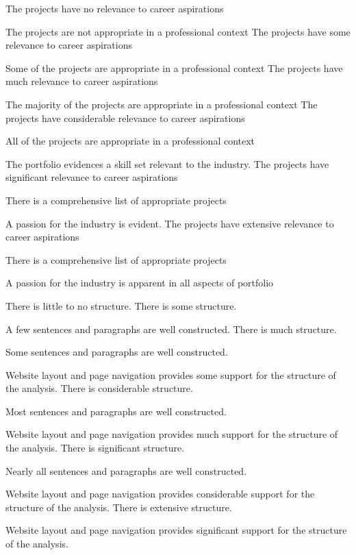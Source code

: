\documentclass{../../fal_assignment}
\begin{document}
\begin{markingrubric}
        \grade \fail  	The projects have no relevance to career aspirations
        		\par 			The projects are not appropriate in a professional context			
        \grade 		The projects have some relevance to career aspirations
        		\par 			Some of the projects are appropriate in a professional context
	\grade 		The projects have much relevance to career aspirations
		\par			The majority of the projects are appropriate in a professional context
        \grade 		The projects have considerable relevance to career aspirations
        		\par 			All of the projects are appropriate in a professional context
		\par			The portfolio evidences a skill set relevant to the industry.
        \grade 		The projects have significant relevance to career aspirations
        		\par			There is a comprehensive list of appropriate projects
		\par			A passion for the industry is evident.
        \grade 		The projects have extensive relevance to career aspirations	
      		\par 			There is a comprehensive list of appropriate projects
		\par 			A passion for the industry is apparent in all aspects of portfolio
        
        \grade\fail 	There is little to no structure.
        \grade 		There is some structure.
        \par 		A few sentences and paragraphs are well constructed.
        \grade 		There is much structure.
        \par 		Some sentences and paragraphs are well constructed.
        \par 		Website layout and page navigation provides some support for the structure of the analysis.
        \grade 		There is considerable structure.
        \par 		Most sentences and paragraphs are well constructed.
        \par 		Website layout and page navigation provides much support for the structure of the analysis.
        \grade 		There is significant structure.
        \par 		Nearly all sentences and paragraphs are well constructed.
        \par 		Website layout and page navigation provides considerable support for the structure of the analysis.
        \grade 		There is extensive structure.
        \par 		Website layout and page navigation provides significant support for the structure of the analysis.


\end{markingrubric}
\end{document}
